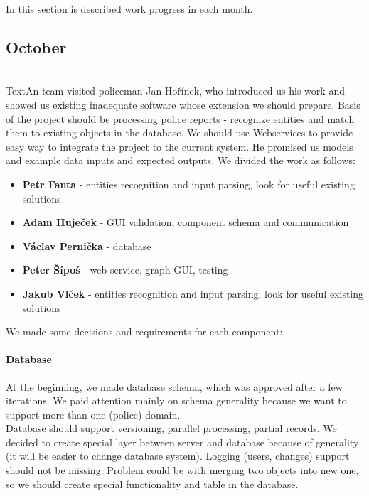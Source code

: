 In this section is described work progress in each month.

\subsection{October}
\\
TextAn team visited policeman Jan Hořínek, who introduced us his work and showed
us existing inadequate software whose extension we should prepare. Basis of the
project should be processing police reports - recognize entities and match them
to existing objects in the database. We should use Webservices to provide easy
way to integrate the project to the current system. He promised us models and
example data inputs and expected outputs. We divided the work as follows:

\begin{itemize}
\item \textbf{Petr Fanta} - entities recognition and input parsing, look for useful existing solutions
\item \textbf{Adam Huječek} - GUI validation, component schema and communication
\item \textbf{Václav Pernička} - database
\item \textbf{Peter Šípoš} - web service, graph GUI, testing
\item \textbf{Jakub Vlček} - entities recognition and input parsing, look for useful existing solutions
\end{itemize}

We made some decisions and requirements for each component:

\paragraph{Database}
At the beginning, we made database schema, which was approved after a few
iterations. We paid attention mainly on schema generality because we want to
support more than one (police) domain.\\
Database should support versioning, parallel processing, partial records. We
decided to create special layer between server and database because of
generality (it will be easier to change database system). Logging (users,
changes) support should not be missing. Problem could be with merging two
objects into new one, so we should create special functionality and table in the
database.

